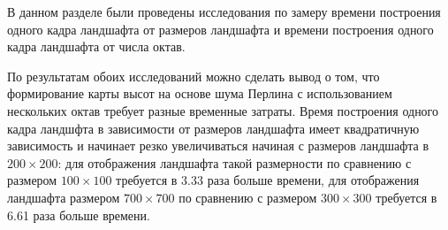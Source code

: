 В данном разделе были проведены исследования по замеру времени построения одного кадра ландшафта от размеров ландшафта и времени построения одного кадра  ландшафта от числа октав.

По результатам обоих исследований можно сделать вывод о том, что формирование карты высот на основе шума Перлина с использованием нескольких октав требует разные временные затраты. Время построения одного кадра ландшфта в зависимости от размеров ландшафта имеет квадратичную зависимость и начинает резко увеличиваться начиная с размеров ландшафта в $200\times200$: для отображения ландшафта такой размерности по сравнению с размером  $100\times100$ требуется в 3.33 раза больше времени, для отображения ландшафта размером $700\times700$ по сравнению с размером  $300\times300$ требуется в 6.61 раза больше времени.





